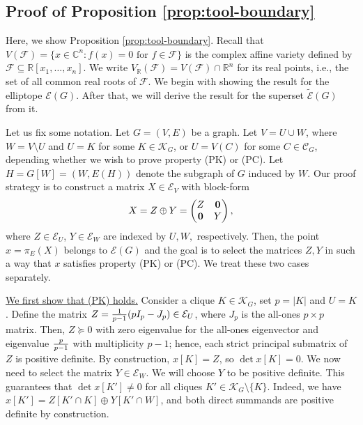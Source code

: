 \documentclass[a4paper, 11pt, twoside]{article}
\newcommand{\C}{\mathbb{C}}
\newcommand{\R}{\mathbb{R}}
\newcommand{\ME}{{\mathcal E}}
\newcommand{\MF}{{\mathcal F}}
\newcommand{\MK}{{\mathcal K}}
\newcommand{\MC}{{\mathcal C}}
\newcommand{\azero}{\mathbf{0}}
\newcommand{\tME}{\widetilde \ME}
\theoremstyle{plain}
\begin{document}
\subsection{ Proof of Proposition \ref{prop:tool-boundary}}\label{sec:proof-prop}

Here, we show Proposition \ref{prop:tool-boundary}. Recall that $V(\MF)=\{x\in\C^n: f(x)=0 \text{ for } f\in\MF\}$ is the complex affine variety defined by $\MF\subseteq \R[x_1,\ldots,x_n]$. We write $V_\R(\MF)=V(\MF)\cap\R^n$ for its real points, i.e., the set of all common real roots of $\MF$. We begin with showing the result for the  elliptope $\ME(G)$. After that, we will derive the result for the superset $\tME(G)$ from it.

 Let us fix some notation.
Let $G=(V,E)$ be a graph. 
Let $V=U\cup W$, where $W=V\setminus U$ and $U=K$ for some $K\in \MK_G$, or $U=V(C)$ for some $C\in\MC_G$, depending whether we wish to prove  property (PK) or   (PC). Let $H=G[W]=(W,E(H))$ denote the subgraph of $G$ induced by $W$. 
Our proof strategy is to construct a matrix $X\in \ME_V$ with block-form
 \begin{align}\label{eq:ZplusY}
 X=Z\oplus Y=\begin{pmatrix} Z & \azero\cr \azero & Y\end{pmatrix},
 \end{align}
where $Z\in\ME_U$, $Y\in\ME_W$ are indexed  by $U,W,$ respectively. Then, the point $x=\pi_E(X)$ belongs to $\ME(G)$ and the goal is to select the matrices $Z,Y$ in such a way that $x$ satisfies property (PK) or (PC). 
We treat these two cases separately. 

\smallskip\noindent
\underline{We first show that (PK) holds.} Consider a clique $K \in \MK_{G}$, set $p=|K|$ and $U=K$.
Define the matrix $Z={1\over p-1}(pI_p-J_p)\in \ME_U$, where $J_p$ is the all-ones $p\times p$ matrix. Then, $Z\succeq 0$ with zero eigenvalue for the all-ones eigenvector and eigenvalue $p\over p-1$ with multiplicity $p-1$; hence, each strict principal submatrix of $Z$ is positive definite.
By construction,   $x[K]=Z$, so $\det x[K]=0$.
We now need to select the matrix $Y\in \ME_W$. We will choose $Y$ to be positive definite. This guarantees that $\det x[K']\neq0$ for all cliques $K'\in\MK_G\setminus\{K\}$. Indeed, we have $x[K']=Z[K'\cap K]\oplus Y[K'\cap W]$, and both direct summands are positive definite by construction. 
\end{document}
